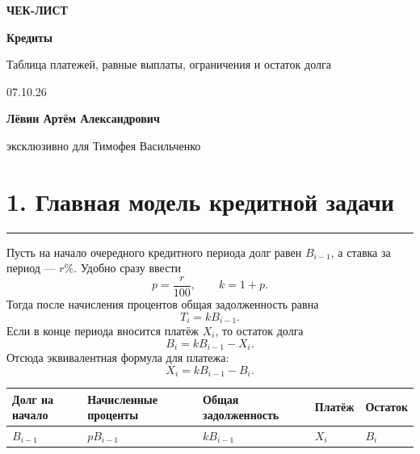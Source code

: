 \documentclass[a4paper,12pt]{article}
\newcommand{\sectionline}{\vspace{-0.4em}\textcolor{linegray}{\rule{\linewidth}{0.5pt}}\vspace{0.35em}}
\begin{document}
\thispagestyle{empty}
\begin{center}
\vspace*{2.8cm}
{\Large\textcolor{softgray}{\textbf{ЧЕК-ЛИСТ}}}\par
\vspace{0.7cm}
{\Huge\bfseries\textcolor{darkaccent}{Кредиты}}\par
\vspace{0.45cm}
{\Large Таблица платежей, равные выплаты, ограничения и остаток долга}\par
\vspace{1.4cm}
{\large 07.10.26}\par
\vfill
{\large\textbf{Лёвин Артём Александрович}}\par
\vspace{0.2cm}
{\large эксклюзивно для Тимофея Васильченко}\par
\vspace{1.2cm}
\end{center}

\clearpage

\section*{1. Главная модель кредитной задачи}
\sectionline

Пусть на начало очередного кредитного периода долг равен $B_{i-1}$, а ставка за период --- $r\%$.
Удобно сразу ввести
\[
p=\frac{r}{100},\qquad k=1+p.
\]
Тогда после начисления процентов общая задолженность равна
\[
T_i=kB_{i-1}.
\]
Если в конце периода вносится платёж $X_i$, то остаток долга
\[
\boxed{B_i=kB_{i-1}-X_i.}
\]
Отсюда эквивалентная формула для платежа:
\[
\boxed{X_i=kB_{i-1}-B_i.}
\]

\begin{center}
\begin{tabularx}{\linewidth}{>{\centering\arraybackslash}X >{\centering\arraybackslash}X >{\centering\arraybackslash}X >{\centering\arraybackslash}X >{\centering\arraybackslash}X}
\toprule
Долг на начало & Начисленные проценты & Общая задолженность & Платёж & Остаток \\
\midrule
$B_{i-1}$ & $pB_{i-1}$ & $kB_{i-1}$ & $X_i$ & $B_i$ \\
\bottomrule
\end{tabularx}
\end{center}
\end{document}
